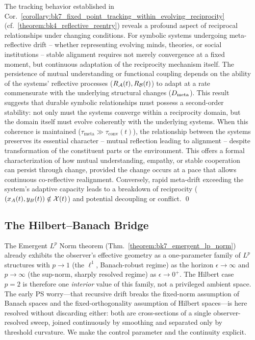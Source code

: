 \begin{scholium}
\label{scholium:bk7_unnamed_scholium_03}
The tracking behavior established in Cor.~\ref{corollary:bk7_fixed_point_tracking_within_evolving_reciprocity} (cf.~\ref{theorem:bk4_reflective_reentry}) reveals a profound aspect of reciprocal relationships under changing conditions. For symbolic systems undergoing meta-reflective drift -- whether representing evolving minds, theories, or social institutions -- stable alignment requires not merely convergence at a fixed moment, but continuous adaptation of the reciprocity mechanism itself. The persistence of mutual understanding or functional coupling depends on the ability of the systems' reflective processes (\(R_{\mathcal{A}}(t), R_{\mathcal{B}}(t)\)) to adapt at a rate commensurate with the underlying structural changes (\(D_{\mathrm{meta}}\)).
This result suggests that durable symbolic relationships must possess a second-order stability: not only must the systems converge within a reciprocity domain, but the domain itself must evolve coherently with the underlying systems. When this coherence is maintained (\(\tau_{\mathrm{meta}} \gg \tau_{\mathrm{conv}}(t)\)), the relationship between the systems preserves its essential character -- mutual reflection leading to alignment -- despite transformation of the constituent parts or the environment. This offers a formal characterization of how mutual understanding, empathy, or stable cooperation can persist through change, provided the change occurs at a pace that allows continuous co-reflective realignment. Conversely, rapid meta-drift exceeding the system's adaptive capacity leads to a breakdown of reciprocity (\( (x_A(t), y_B(t)) \notin \mathcal{X}(t) \)) and potential decoupling or conflict. \qed
\end{scholium}
\subsection{The Hilbert--Banach Bridge}
\label{subsec:bk7_hilbert_banach_bridge}
The Emergent $L^{p}$ Norm theorem (Thm.~\ref{theorem:bk7_emergent_lp_norm})
already exhibits the observer's effective geometry as a one-parameter family of
$L^{p}$ structures with $p\to 1$ (the $\ell^{1}$, Banach-robust regime) as the
horizon $\epsilon\to\infty$ and $p\to\infty$ (the sup-norm, sharply resolved
regime) as $\epsilon\to 0^{+}$. The Hilbert case $p=2$ is therefore one
\emph{interior} value of this family, not a privileged ambient space. The early
PS worry---that recursive drift breaks the fixed-norm assumption of Banach
spaces and the fixed-orthogonality assumption of Hilbert spaces---is here
resolved without discarding either: both are cross-sections of a single
observer-resolved sweep, joined continuously by smoothing and separated only by
threshold curvature. We make the control parameter and the continuity explicit.

